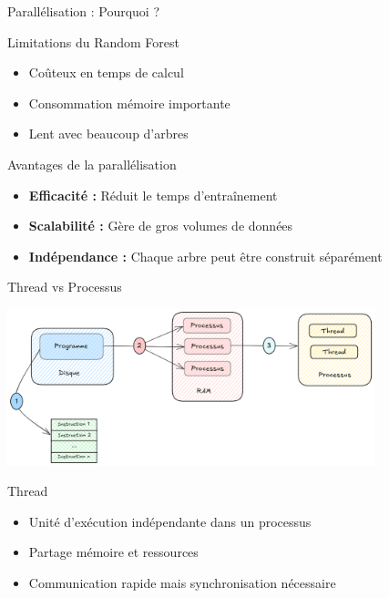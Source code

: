 \documentclass{beamer}
\begin{document}
	\begin{frame}{Parallélisation : Pourquoi ?}
		\begin{block}{Limitations du Random Forest}
			\begin{itemize}
				\item<1-> Coûteux en temps de calcul
				\item<1-> Consommation mémoire importante
				\item<1-> Lent avec beaucoup d'arbres
			\end{itemize}
		\end{block}
		
		\begin{block}{Avantages de la parallélisation}
			\begin{itemize}
				\item<2-> \textbf{Efficacité :} Réduit le temps d'entraînement
				\item<2-> \textbf{Scalabilité :} Gère de gros volumes de données
				\item<2-> \textbf{Indépendance :} Chaque arbre peut être construit séparément
			\end{itemize}
		\end{block}
	\end{frame}
	
	\begin{frame}{Thread vs Processus}
		\begin{center}
			\includegraphics[width=0.8\textwidth]{assets/process_thread.png}
		\end{center}
		
		\begin{block}{Thread}
			\begin{itemize}
				\item<2-> Unité d'exécution indépendante dans un processus
				\item<3-> Partage mémoire et ressources
				\item<4-> Communication rapide mais synchronisation nécessaire
			\end{itemize}
		\end{block}
	\end{frame}
	
\end{document}
